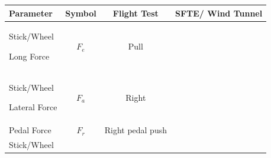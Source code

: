 \documentclass[
]{book}
\begin{document}
\begin{longtable}[]{@{}lccc@{}}
\toprule
\begin{minipage}[b]{0.38\columnwidth}\raggedright
\textbf{Parameter}\strut
\end{minipage} & \begin{minipage}[b]{0.20\columnwidth}\centering
\textbf{Symbol}\strut
\end{minipage} & \begin{minipage}[b]{0.15\columnwidth}\centering
\textbf{Flight Test}\strut
\end{minipage} & \begin{minipage}[b]{0.15\columnwidth}\centering
\textbf{SFTE/}
\textbf{Wind Tunnel}\strut
\end{minipage}\tabularnewline
\midrule
\endhead
\begin{minipage}[t]{0.38\columnwidth}\raggedright
Stick/Wheel

Long Force\strut
\end{minipage} & \begin{minipage}[t]{0.20\columnwidth}\centering
\(F_e\)\strut
\end{minipage} & \begin{minipage}[t]{0.15\columnwidth}\centering
Pull\strut
\end{minipage} & \begin{minipage}[t]{0.15\columnwidth}\centering
\strut
\end{minipage}\tabularnewline
\begin{minipage}[t]{0.38\columnwidth}\raggedright
Stick/Wheel

Lateral Force\strut
\end{minipage} & \begin{minipage}[t]{0.20\columnwidth}\centering
\(F_a\)\strut
\end{minipage} & \begin{minipage}[t]{0.15\columnwidth}\centering
Right\strut
\end{minipage} & \begin{minipage}[t]{0.15\columnwidth}\centering
\strut
\end{minipage}\tabularnewline
\begin{minipage}[t]{0.38\columnwidth}\raggedright
Pedal Force\strut
\end{minipage} & \begin{minipage}[t]{0.20\columnwidth}\centering
\(F_r\)\strut
\end{minipage} & \begin{minipage}[t]{0.15\columnwidth}\centering
Right pedal push\strut
\end{minipage} & \begin{minipage}[t]{0.15\columnwidth}\centering
\strut
\end{minipage}\tabularnewline
\begin{minipage}[t]{0.38\columnwidth}\raggedright
Stick/Wheel


\end{minipage}
\end{longtable}
\end{document}
